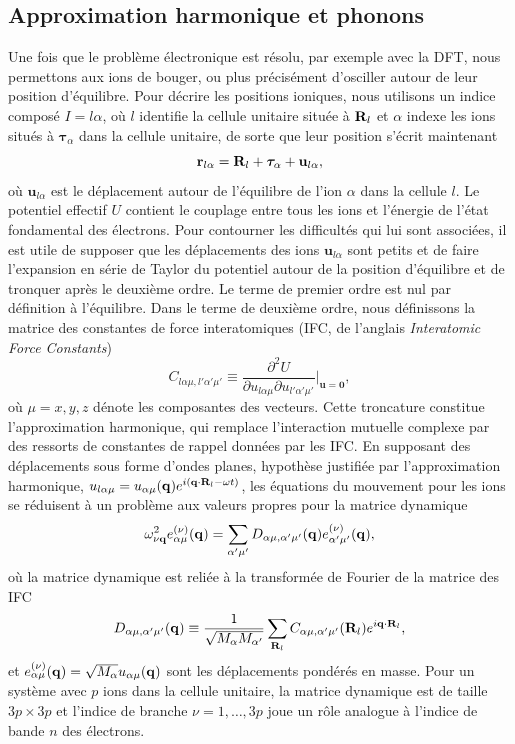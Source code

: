 \subsection{Approximation harmonique et phonons}\label{sec:phonon_harmonique}
Une fois que le problème électronique est résolu, par exemple avec la DFT, nous permettons aux ions de bouger, ou plus précisément d'osciller autour de leur position d'équilibre. Pour décrire les positions ioniques, nous utilisons un indice composé $I=l\alpha$, où $l$ identifie la cellule unitaire située à $\mathbf{R}_l$ et $\alpha$ indexe les ions situés à $\bm{\tau}_\alpha$ dans la cellule unitaire, de sorte que leur position s'écrit maintenant
\begin{equation}
    \mathbf{r}_{l\alpha}=\mathbf{R}_l+\bm{\tau}_\alpha+\mathbf{u}_{l\alpha},
    \label{eqn:c2_rla}
\end{equation}
où $\mathbf{u}_{l\alpha}$ est le déplacement autour de l'équilibre de l'ion $\alpha$ dans la cellule $l$. Le potentiel effectif $U$ contient le couplage entre tous les ions et l'énergie de l'état fondamental des électrons. Pour contourner les difficultés qui lui sont associées, il est utile de supposer que les déplacements des ions $\mathbf{u}_{l\alpha}$ sont petits et de faire l'expansion en série de Taylor du potentiel autour de la position d'équilibre et de tronquer après le deuxième ordre. Le terme de premier ordre est nul par définition à l'équilibre. Dans le terme de deuxième ordre, nous définissons la matrice des constantes de force interatomiques (IFC, de l'anglais \textit{Interatomic Force Constants})
\begin{equation}
    C_{l\alpha\mu,l'\alpha'\mu'}\equiv \frac{\partial^2U}{\partial u_{l\alpha\mu}\partial u_{l'\alpha'\mu'}}\bigg\rvert_{\mathbf{u}=\mathbf{0}},
    \label{eqn:c2_IFC}
\end{equation}
où $\mu=x,y,z$ dénote les composantes des vecteurs. Cette troncature constitue l'approximation harmonique, qui remplace l'interaction mutuelle complexe par des ressorts de constantes de rappel données par les IFC. En supposant des déplacements sous forme d'ondes planes, hypothèse justifiée par l'approximation harmonique, $u_{l\alpha\mu}=u_{\alpha\mu}(\mathbf{q})e^{i(\mathbf{q}\cdot\mathbf{R}_l-\omega t)}$, les équations du mouvement pour les ions se réduisent à un problème aux valeurs propres pour la matrice dynamique
\begin{equation}
    \omega_{\nu\mathbf{q}}^2e_{\alpha\mu}^{(\nu)}(\mathbf{q})=\sum_{\alpha'\mu'}D_{\alpha\mu,\alpha'\mu'}(\mathbf{q})e_{\alpha'\mu'}^{(\nu)}(\mathbf{q}),
    \label{eqn:c2_ionsEOM}
\end{equation}
où la matrice dynamique est reliée à la transformée de Fourier de la matrice des IFC
\begin{equation}
    D_{\alpha\mu,\alpha'\mu'}(\mathbf{q})\equiv\frac{1}{\sqrt{M_\alpha M_{\alpha'}}}\sum_{\mathbf{R}_l}C_{\alpha\mu,\alpha'\mu'}(\mathbf{R}_l)e^{i\mathbf{q}\cdot\mathbf{R}_l},
    \label{eqn:c2_D}
\end{equation}
et $e_{\alpha\mu}^{(\nu)}(\mathbf{q}) = \sqrt{M_\alpha}u_{\alpha\mu}(\mathbf{q})$ sont les déplacements pondérés en masse. Pour un système avec $p$ ions dans la cellule unitaire, la matrice dynamique est de taille $3p\times 3p$ et l'indice de branche $\nu=1,\dots,3p$ joue un rôle analogue à l'indice de bande $n$ des électrons.

